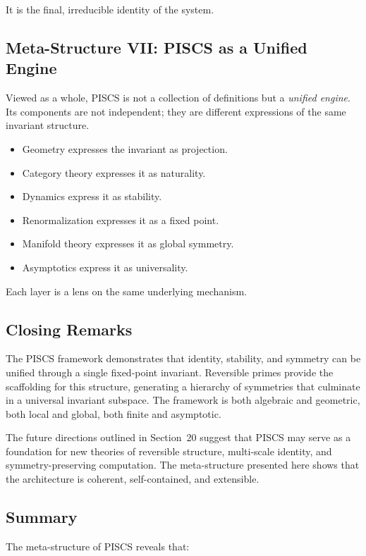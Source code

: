 \documentclass[11pt]{article}
\theoremstyle{definition}
\theoremstyle{plain}
\theoremstyle{remark}
\begin{document}
It is the final, irreducible identity of the system.

\subsection{Meta-Structure VII: PISCS as a Unified Engine}

Viewed as a whole, PISCS is not a collection of definitions but a
\emph{unified engine}. Its components are not independent; they are
different expressions of the same invariant structure.

\begin{itemize}
    \item Geometry expresses the invariant as projection.
    \item Category theory expresses it as naturality.
    \item Dynamics express it as stability.
    \item Renormalization expresses it as a fixed point.
    \item Manifold theory expresses it as global symmetry.
    \item Asymptotics express it as universality.
\end{itemize}

Each layer is a lens on the same underlying mechanism.

\subsection{Closing Remarks}

The PISCS framework demonstrates that identity, stability, and symmetry
can be unified through a single fixed-point invariant. Reversible primes
provide the scaffolding for this structure, generating a hierarchy of
symmetries that culminate in a universal invariant subspace. The
framework is both algebraic and geometric, both local and global, both
finite and asymptotic.

The future directions outlined in Section~20 suggest that PISCS may
serve as a foundation for new theories of reversible structure,
multi-scale identity, and symmetry-preserving computation. The
meta-structure presented here shows that the architecture is coherent,
self-contained, and extensible.

\subsection{Summary}

The meta-structure of PISCS reveals that:
\end{document}
